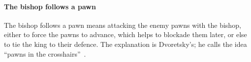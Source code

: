 
\paragraph{The bishop follows a pawn}\label{bishop-follows-pawn}
The bishop follows a pawn means attacking the enemy pawns with the bishop, either to force the pawns
to advance, which helps to blockade them later, or else to tie the king to their defence. The
explanation is Dvoretsky's; he calls the idea ``pawns in the crosshairs''~\cite{Dvoretsky:2008-endgame-manual}.
